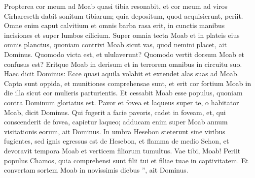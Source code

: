 \begin{biblechapter}
\begin{biblechapter}
\begin{biblechapter}
\begin{biblechapter}
\begin{biblechapter}
\begin{biblechapter}
\begin{biblechapter}
\begin{biblechapter}
\begin{biblechapter}
\begin{biblechapter}
\begin{biblechapter}
\begin{biblechapter}
\begin{biblechapter}
\begin{biblechapter}
\begin{biblechapter}
\begin{biblechapter}
\begin{biblechapter}
\begin{biblechapter}
\begin{biblechapter}
\begin{biblechapter}
\begin{biblechapter}
\begin{biblechapter}
\begin{biblechapter}
\begin{biblechapter}
\begin{biblechapter}
\begin{biblechapter}
\begin{biblechapter}
\begin{biblechapter}
\begin{biblechapter}
\begin{biblechapter}
\begin{biblechapter}
\begin{biblechapter}
\begin{biblechapter}
\begin{biblechapter}
\begin{biblechapter}
\begin{biblechapter}
\begin{biblechapter}
\begin{biblechapter}
\begin{biblechapter}
\begin{biblechapter}
\begin{biblechapter}
\begin{biblechapter}
\begin{biblechapter}
\begin{biblechapter}
\begin{biblechapter}
\begin{biblechapter}
\begin{biblechapter}
\begin{biblechapter}
\verse Propterea cor meum ad Moab quasi tibia resonabit, et cor meum ad viros Cirhareseth dabit sonitum tibiarum; quia depositum, quod acquisierunt, periit. 
\verse Omne enim caput calvitium et omnis barba rasa erit, in cunctis manibus incisiones et super lumbos cilicium. 
\verse Super omnia tecta Moab et in plateis eius omnis planctus, quoniam contrivi Moab sicut vas, quod nemini placet, ait Dominus. 
\verse Quomodo victa est, et ululaverunt? Quomodo vertit dorsum Moab et confusus est? Eritque Moab in derisum et in terrorem omnibus in circuitu suo.
 \verse Haec dicit Dominus:
 Ecce quasi aquila volabit
 et extendet alas suas ad Moab.
 \verse Capta sunt oppida,
 et munitiones comprehensae sunt,
 et erit cor fortium Moab in die illa
 sicut cor mulieris parturientis.
 \verse Et cessabit Moab esse populus,
 quoniam contra Dominum gloriatus est.
 \verse Pavor et fovea et laqueus super te,
 o habitator Moab,
 dicit Dominus.
 \verse Qui fugerit a facie pavoris, cadet in foveam,
 et, qui conscenderit de fovea, capietur laqueo;
 adducam enim super Moab
 annum visitationis eorum,
 ait Dominus.
 \verse In umbra Hesebon steterunt sine viribus fugientes,
 sed ignis egressus est de Hesebon,
 et flamma de medio Sehon,
 et devoravit tempora Moab
 et verticem filiorum tumultus.
 \verse Vae tibi, Moab!
 Periit populus Chamos,
 quia comprehensi sunt filii tui
 et filiae tuae in captivitatem.
 \verse Et convertam sortem Moab in novissimis diebus ”,
 ait Dominus.

\end{biblechapter}
\end{biblechapter}
\end{biblechapter}
\end{biblechapter}
\end{biblechapter}
\end{biblechapter}
\end{biblechapter}
\end{biblechapter}
\end{biblechapter}
\end{biblechapter}
\end{biblechapter}
\end{biblechapter}
\end{biblechapter}
\end{biblechapter}
\end{biblechapter}
\end{biblechapter}
\end{biblechapter}
\end{biblechapter}
\end{biblechapter}
\end{biblechapter}
\end{biblechapter}
\end{biblechapter}
\end{biblechapter}
\end{biblechapter}
\end{biblechapter}
\end{biblechapter}
\end{biblechapter}
\end{biblechapter}
\end{biblechapter}
\end{biblechapter}
\end{biblechapter}
\end{biblechapter}
\end{biblechapter}
\end{biblechapter}
\end{biblechapter}
\end{biblechapter}
\end{biblechapter}
\end{biblechapter}
\end{biblechapter}
\end{biblechapter}
\end{biblechapter}
\end{biblechapter}
\end{biblechapter}
\end{biblechapter}
\end{biblechapter}
\end{biblechapter}
\end{biblechapter}
\end{biblechapter}
